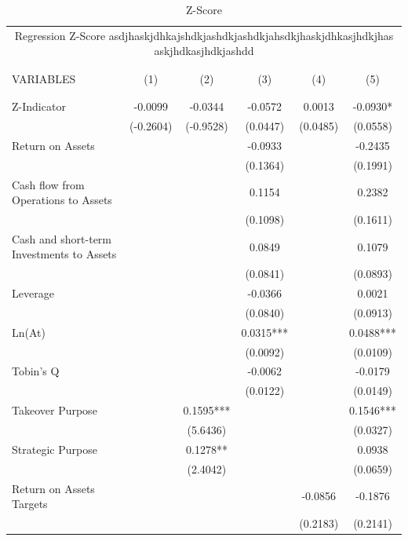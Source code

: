 \documentclass[12pt]{article}
\begin{document}
	\begin{table}[ht]
	\centering
	\caption{Z-Score}

	\begin{adjustbox}{height=10cm, max width=\textwidth}
		
		\begin{tabular}{lccccc}
			\\
			\multicolumn{6}{c}{Regression Z-Score asdjhaskjdhkajshdkjashdkjashdkjahsdkjhaskjdhkasjhdkjhas askjhdkasjhdkjashdd} \\ \\ \hline
			 \\
			VARIABLES  & (1) & (2) & (3) & (4) & (5) \\ \\ \hline
			 &  &  &  &  &  \\
			Z-Indicator & -0.0099 & -0.0344 & -0.0572 & 0.0013 & -0.0930* \\
			 & (-0.2604) & (-0.9528) & (0.0447) & (0.0485) & (0.0558) \\
			Return on Assets &  &  & -0.0933 &  & -0.2435 \\
			 &  &  & (0.1364) &  & (0.1991) \\
			Cash flow from Operations to Assets &  &  & 0.1154 &  & 0.2382 \\
			 &  &  & (0.1098) &  & (0.1611) \\
			Cash and short-term Investments to Assets &  &  & 0.0849 &  & 0.1079 \\
			 &  &  & (0.0841) &  & (0.0893) \\
			Leverage &  &  & -0.0366 &  & 0.0021 \\
			 &  &  & (0.0840) &  & (0.0913) \\
			Ln(At) &  &  & 0.0315*** &  & 0.0488*** \\
			 &  &  & (0.0092) &  & (0.0109) \\
			Tobin's Q &  &  & -0.0062 &  & -0.0179 \\
			 &  &  & (0.0122) &  & (0.0149) \\
			Takeover Purpose &  & 0.1595*** &  &  & 0.1546*** \\
			 &  & (5.6436) &  &  & (0.0327) \\
			Strategic Purpose &  & 0.1278** &  &  & 0.0938 \\
			 &  & (2.4042) &  &  & (0.0659) \\
			Return on Assets Targets &  &  &  & -0.0856 & -0.1876 \\
			 &  &  &  & (0.2183) & (0.2141) \\

\end{tabular}
\end{adjustbox}
\end{table}
\end{document}
